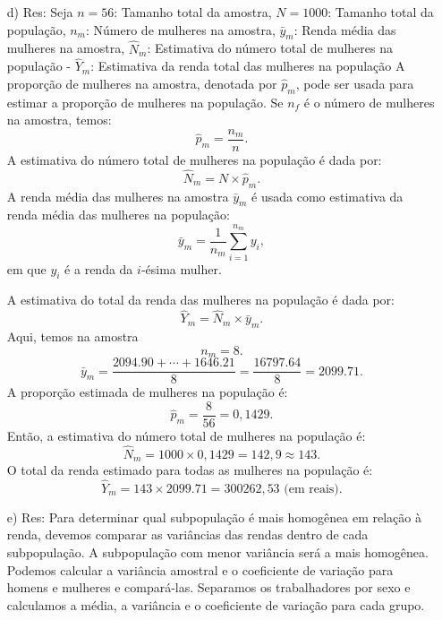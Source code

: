 \documentclass[a4paper,12pt,oneside,twocolumn]{Config/milktest}
\begin{document}
{\begin{itemize}
    \item[d) Res:]  
Seja  \( n = 56 \): Tamanho total da amostra, \( N = 1000 \): Tamanho total da população, \( n_m \): Número de mulheres na amostra, \( \bar{y}_m \): Renda média das mulheres na amostra, \( \hat{N}_m \): Estimativa do número total de mulheres na população
- \( \hat{Y}_m \): Estimativa da renda total das mulheres na população
A proporção de mulheres na amostra, denotada por \( \hat{p}_m \), pode ser usada para estimar a proporção de mulheres na população. Se \( n_f \) é o número de mulheres na amostra, temos:
   \[
   \hat{p}_m = \frac{n_m}{n}.
   \]
   A estimativa do número total de mulheres na população é dada por:
   \[
   \hat{N}_m = N \times \hat{p}_m.
   \]
   A renda média das mulheres na amostra \( \bar{y}_m \) é usada como estimativa da renda média das mulheres na população:
   \[
   \bar{y}_m = \frac{1}{n_m} \sum_{i=1}^{n_m} y_i,
   \]
   em que \( y_i \) é a renda da \( i \)-ésima mulher.
   
   A estimativa do total da renda das mulheres na população é dada por:
   \[
   \hat{Y}_m = \hat{N}_m \times \bar{y}_m.
   \]
Aqui, temos na amostra
   \[
   n_m = 8.
   \]\[
   \bar{y}_m = \frac{2094.90 + \cdots + 1646.21}{8} = \frac{16797.64}{8} = 2099.71.
   \]
 A proporção estimada de mulheres na população é:
   \[
   \hat{p}_m= \frac{8}{56} = 0,1429.
   \]
   Então, a estimativa do número total de mulheres na população é:
   \[
   \hat{N}_m = 1000 \times 0,1429 = 142,9 \approx 143.
   \]
   O total da renda estimado para todas as mulheres na população é:
   \[
   \hat{Y}_m = 143 \times 2099.71 = 300262,53 \text{ (em reais)}.
   \]

\item[e) Res:]   Para determinar qual subpopulação é mais homogênea em relação à renda, devemos comparar as variâncias das rendas dentro de cada subpopulação. A subpopulação com menor variância será a mais homogênea. Podemos calcular a variância amostral e o coeficiente de variação para homens e mulheres e compará-las. Separamos os trabalhadores por sexo e calculamos a média, a variância e o coeficiente de variação para cada grupo. 


\end{itemize}}
\end{document}
